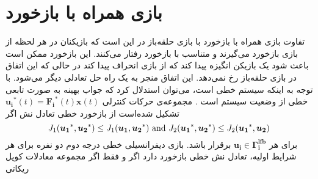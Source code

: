 \section{بازی همراه با بازخورد}\label{closedloop_game}
تفاوت بازی همراه با بازخورد با بازی حلقه‌باز در این است که بازیکنان در هر لحظه از بازی بازخورد می‌گیرند و متناسب با بازخورد رفتار می‌کنند. این بازخورد ممکن است باعث شود یک بازیکن انگیزه پیدا کند که از بازی انحراف پیدا کند در حالی که این اتفاق در بازی حلقه‌باز رخ نمی‌دهد. این اتفاق منجر به یک راه حل تعادلی دیگر می‌شود. 
با توجه به اینکه سیستم خطی است، می‌توان استدلال کرد که جواب بهینه به صورت تابعی خطی از وضعیت سیستم است \cite{article1}
.
%
مجموعه‌ی حرکات کنترلی 
$\boldsymbol{u_i}^*(t)=\boldsymbol{F_i}^*(t)\boldsymbol{x}(t)$
تشکیل شده‌است از بازخورد خطی تعادل نش اگر
\begin{equation*}
	J_1(\boldsymbol{u_1}^*, \boldsymbol{u_2}^*)\leq J_1(\boldsymbol{u_1}, \boldsymbol{u_2}^*)\text{\rm{ and }}
	J_2(\boldsymbol{u_1}^*,\boldsymbol{ u_2}^*)\leq J_2(\boldsymbol{u_1}^*, \boldsymbol{u_2})
\end{equation*}
برای هر 
$\boldsymbol{u_i}\in \boldsymbol{\Gamma^{lfb}_i}$
برقرار باشد.
بازی دیفرانسیلی خطی درجه دوم دو نفره برای هر شرایط اولیه، تعادل نش خطی بازخورد دارد اگر و فقط اگر مجموعه معادلات کوپل ریکاتی

